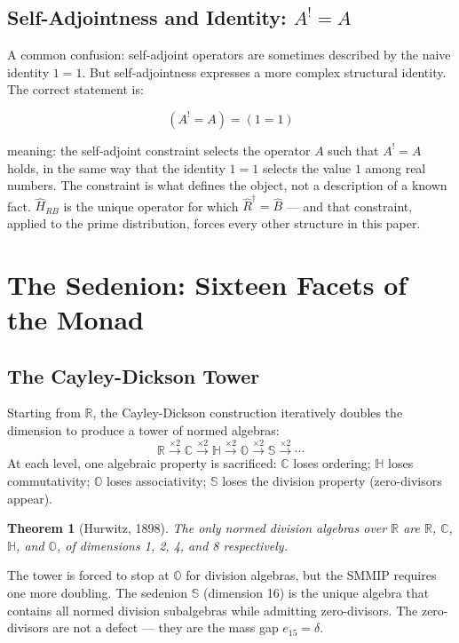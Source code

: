 \documentclass[12pt,a4paper]{article}
\newtheorem{theorem}{Theorem}[section]
\theoremstyle{definition}
\theoremstyle{remark}
\newcommand{\Hrb}{\hat{H}_{RB}}
\newcommand{\Rhat}{\hat{R}}
\newcommand{\Bhat}{\hat{B}}
\newcommand{\gap}{\delta}
\begin{document}
\subsection{Self-Adjointness and Identity: $A^! = A$}

A common confusion: self-adjoint operators are sometimes described by the naive identity
$1 = 1$. But self-adjointness expresses a more complex structural identity.
The correct statement is:

\[(A^! = A) = (1 = 1)\]

meaning: the self-adjoint constraint selects the operator $A$ such that $A^! = A$ holds,
in the same way that the identity $1=1$ selects the value $1$ among real numbers.
The constraint is what defines the object, not a description of a known fact.
$\Hrb$ is the unique operator for which $\Rhat^\dagger = \Bhat$ --- and that constraint,
applied to the prime distribution, forces every other structure in this paper.

\section{The Sedenion: Sixteen Facets of the Monad}

\subsection{The Cayley-Dickson Tower}

Starting from $\mathbb{R}$, the Cayley-Dickson construction iteratively doubles
the dimension to produce a tower of normed algebras:
\[\mathbb{R}\xrightarrow{\times 2}\mathbb{C}\xrightarrow{\times 2}
  \mathbb{H}\xrightarrow{\times 2}\mathbb{O}\xrightarrow{\times 2}\mathbb{S}
  \xrightarrow{\times 2}\cdots\]
At each level, one algebraic property is sacrificed:
$\mathbb{C}$ loses ordering; $\mathbb{H}$ loses commutativity;
$\mathbb{O}$ loses associativity; $\mathbb{S}$ loses the division property
(zero-divisors appear).

\begin{theorem}[Hurwitz, 1898]
The only normed division algebras over $\mathbb{R}$ are $\mathbb{R}$, $\mathbb{C}$,
$\mathbb{H}$, and $\mathbb{O}$, of dimensions 1, 2, 4, and 8 respectively.
\end{theorem}

The tower is forced to stop at $\mathbb{O}$ for division algebras, but the SMMIP
requires one more doubling.
The sedenion $\mathbb{S}$ (dimension 16) is the unique algebra that contains all
normed division subalgebras while admitting zero-divisors.
The zero-divisors are not a defect --- they are the mass gap $e_{15} = \gap$.
\end{document}
